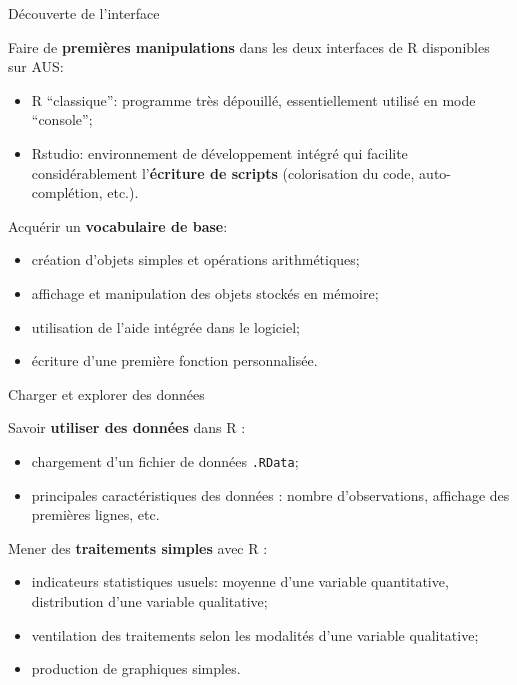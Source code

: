 \documentclass[12pt,ignorenonframetext,]{beamer}
\providecommand{\tightlist}{%
  \setlength{\itemsep}{0pt}\setlength{\parskip}{0pt}}
\begin{document}
\begin{frame}{Découverte de l'interface}

Faire de \textbf{premières manipulations} dans les deux interfaces de R
disponibles sur AUS:

\begin{itemize}
\item
  R \enquote{classique}: programme très dépouillé, essentiellement
  utilisé en mode \enquote{console};
\item
  Rstudio: environnement de développement intégré qui facilite
  considérablement l'\textbf{écriture de scripts} (colorisation du code,
  auto-complétion, etc.).
\end{itemize}

\bigskip \pause Acquérir un \textbf{vocabulaire de base}:

\begin{itemize}
\tightlist
\item
  création d'objets simples et opérations arithmétiques;
\item
  affichage et manipulation des objets stockés en mémoire;
\item
  utilisation de l'aide intégrée dans le logiciel;
\item
  écriture d'une première fonction personnalisée.
\end{itemize}

\end{frame}

\begin{frame}[fragile]{Charger et explorer des données}

Savoir \textbf{utiliser des données} dans R :

\begin{itemize}
\tightlist
\item
  chargement d'un fichier de données \texttt{.RData};
\item
  principales caractéristiques des données : nombre d'observations,
  affichage des premières lignes, etc.
\end{itemize}

\bigskip \pause Mener des \textbf{traitements simples} avec R :

\begin{itemize}
\tightlist
\item
  indicateurs statistiques usuels: moyenne d'une variable quantitative,
  distribution d'une variable qualitative;
\item
  ventilation des traitements selon les modalités d'une variable
  qualitative;
\item
  production de graphiques simples.
\end{itemize}

\end{frame}
\end{document}
